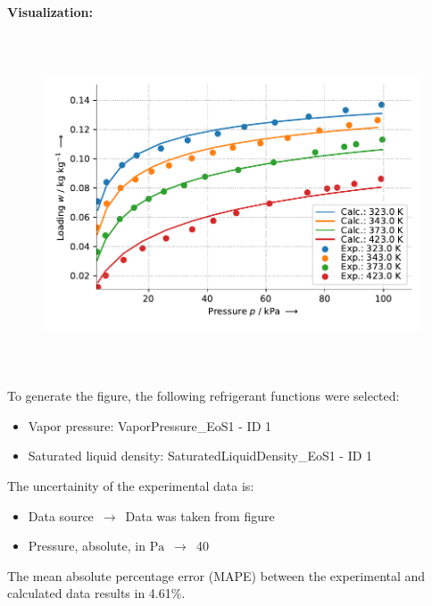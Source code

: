 \textbf{Visualization:}
%
\begin{figure}[!htp]
{\noindent\includegraphics[height=10cm, keepaspectratio]{figs/ads/ads_Propane_zeolite_crystal_5A_Toth_1.pdf}}
\end{figure}
%

To generate the figure, the following refrigerant functions were selected:
\begin{itemize}
\item Vapor pressure: VaporPressure\_EoS1 - ID 1
\item Saturated liquid density: SaturatedLiquidDensity\_EoS1 - ID 1
\end{itemize}

The uncertainity of the experimental data is:
\begin{itemize}
\item Data source $\,\to\,$ Data was taken from figure
\item Pressure, absolute, in $\si{\pascal}$ $\,\to\,$ 40
\end{itemize}

The mean absolute percentage error (MAPE) between the experimental and calculated data results in 4.61\%.
\FloatBarrier
\newpage
